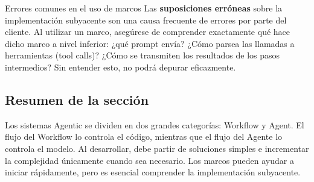 \begin{warningbox}{Errores comunes en el uso de marcos}
Las \textbf{suposiciones erróneas} sobre la implementación subyacente son una causa frecuente de errores por parte del cliente. Al utilizar un marco, asegúrese de comprender exactamente qué hace dicho marco a nivel inferior: ¿qué prompt envía? ¿Cómo parsea las llamadas a herramientas (tool calls)? ¿Cómo se transmiten los resultados de los pasos intermedios? Sin entender esto, no podrá depurar eficazmente.
\end{warningbox}

\subsection{Resumen de la sección}
Los sistemas Agentic se dividen en dos grandes categorías: Workflow y Agent. El flujo del Workflow lo controla el código, mientras que el flujo del Agente lo controla el modelo. Al desarrollar, debe partir de soluciones simples e incrementar la complejidad únicamente cuando sea necesario. Los marcos pueden ayudar a iniciar rápidamente, pero es esencial comprender la implementación subyacente.



